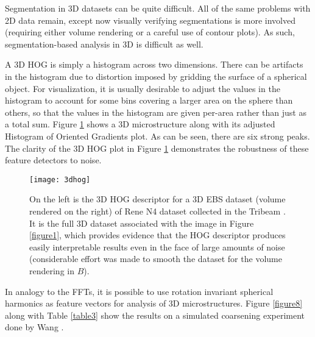 \documentclass[review]{elsarticle}
\begin{document}
	Segmentation in 3D datasets can be quite difficult. All of the same problems with 2D data remain, except now visually verifying segmentations is more involved (requiring either volume rendering or a careful use of contour plots). As such, segmentation-based analysis in 3D is difficult as well.

	A 3D HOG is simply a histogram across two dimensions. There can be artifacts in the histogram due to distortion imposed by gridding the surface of a spherical object. For visualization, it is usually desirable to adjust the values in the histogram to account for some bins covering a larger area on the sphere than others, so that the values in the histogram are given per-area rather than just as a total sum. Figure \ref{figure4} shows a 3D microstructure along with its adjusted Histogram of Oriented Gradients plot. As can be seen, there are six strong peaks. The clarity of the 3D HOG plot in Figure \ref{figure4} demonstrates the robustness of these feature detectors to noise.
	
	\begin{figure}[!ht]
  		\centering
    	\texttt{[image: 3dhog]}
  		\caption{ On the left is the 3D HOG descriptor for a 3D EBS dataset (volume rendered on the right) of Rene N4 dataset collected in the Tribeam \cite{tribeam}. It is the full 3D dataset associated with the image in Figure \ref{figure1}, which provides evidence that the HOG descriptor produces easily interpretable results even in the face of large amounts of noise (considerable effort was made to smooth the dataset for the volume rendering in $B$). }
  		\label{figure4}
	\end{figure}

	In analogy to the FFTs, it is possible to use rotation invariant spherical harmonics \cite{spherical} as feature vectors for analysis of 3D microstructures. Figure \ref{figure8} along with Table \ref{table3} show the results on a simulated coarsening experiment done by Wang \cite{ywang2}.
	
\end{document}
